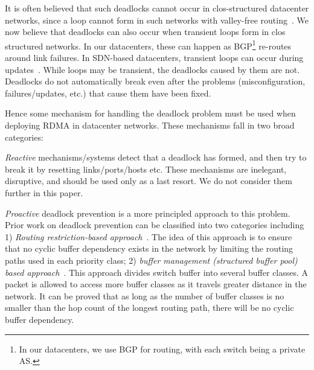 It is often believed that such deadlocks cannot occur in clos-structured
datacenter networks, since a loop cannot form in such networks with valley-free
routing~\cite{dcqcn}.   We now believe that deadlocks
can also occur when transient loops form in clos structured networks. In our
datacenters, these can happen as BGP\footnote{In our datacenters, we use BGP for
routing, with each switch being a private AS.} re-routes around link failures.
In SDN-based datacenters, transient loops can occur during
updates~\cite{dionysus}. While loops may be transient, the deadlocks caused by
them are not. Deadlocks do not automatically break even after the problems
(misconfiguration, failures/updates, etc.) that cause them have been fixed.

Hence some mechanism for handling the deadlock problem must be used when
deploying RDMA in datacenter networks.  These mechanisms fall in two broad
categories: 

{\em Reactive} mechanisms/systems detect that a deadlock has formed, and then
try to break it by resetting links/ports/hosts etc.  These mechanisms are
inelegant, disruptive, and should be used only as a last resort.  We do not
consider them further in this paper.  

{\em Proactive} deadlock prevention is a more principled approach to this
problem. Prior work on deadlock prevention can be classified into two
categories including 1) \textit{Routing restriction-based
approach}~\cite{tcpbolt,flich2012survey}. The idea of this approach is to ensure
that no cyclic buffer dependency exists in the network by limiting the routing
paths used in each priority class;  2) \textit{buffer management (structured
buffer pool) based approach}~\cite{gerla1980flow,karol2003prevention}. This
approach divides switch buffer into several buffer classes. A packet is allowed
to access more buffer classes as it travels greater distance in the network. It
can be proved that as long as the number of buffer classes is no smaller than
the hop count of the longest routing path, there will be no cyclic buffer
dependency.


